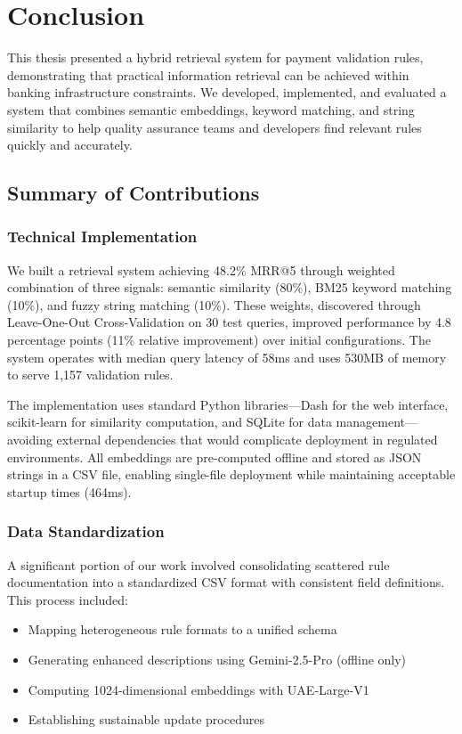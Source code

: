 \chapter{Conclusion}
\label{ch:conclusion}

This thesis presented a hybrid retrieval system for payment validation rules, demonstrating that practical information retrieval can be achieved within banking infrastructure constraints. We developed, implemented, and evaluated a system that combines semantic embeddings, keyword matching, and string similarity to help quality assurance teams and developers find relevant rules quickly and accurately.

\section{Summary of Contributions}

\subsection{Technical Implementation}

We built a retrieval system achieving 48.2\% MRR@5 through weighted combination of three signals: semantic similarity (80\%), BM25 keyword matching (10\%), and fuzzy string matching (10\%). These weights, discovered through Leave-One-Out Cross-Validation on 30 test queries, improved performance by 4.8 percentage points (11\% relative improvement) over initial configurations. The system operates with median query latency of 58ms and uses 530MB of memory to serve 1,157 validation rules.

The implementation uses standard Python libraries—Dash for the web interface, scikit-learn for similarity computation, and SQLite for data management—avoiding external dependencies that would complicate deployment in regulated environments. All embeddings are pre-computed offline and stored as JSON strings in a CSV file, enabling single-file deployment while maintaining acceptable startup times (464ms).

\subsection{Data Standardization}

A significant portion of our work involved consolidating scattered rule documentation into a standardized CSV format with consistent field definitions. This process included:

\begin{itemize}[leftmargin=*,itemsep=2pt,topsep=2pt]
  \item Mapping heterogeneous rule formats to a unified schema
  \item Generating enhanced descriptions using Gemini-2.5-Pro (offline only)
  \item Computing 1024-dimensional embeddings with UAE-Large-V1
  \item Establishing sustainable update procedures
\end{itemize}

